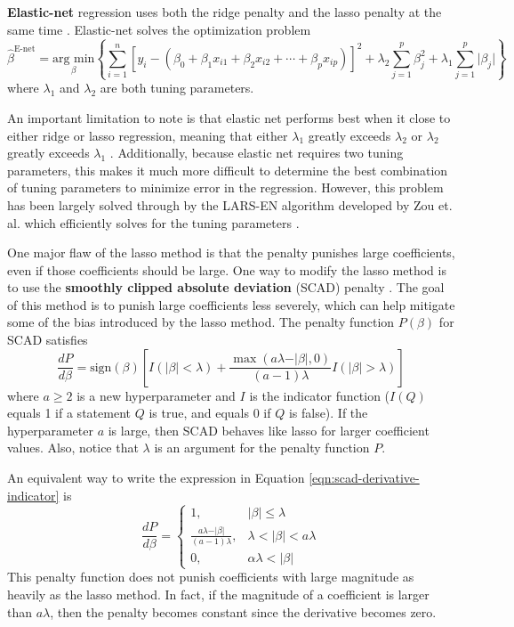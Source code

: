 \documentclass{article}
\newcommand{\argmin}[2]{\underset{#1}{\text{arg min}}\left\{#2\right\}}
\newcommand{\sign}{\text{sign}}
\begin{document}
\textbf{Elastic-net} regression uses both the ridge penalty and the lasso penalty at the same time \cite{zou2005regularization}. Elastic-net solves the optimization problem
\begin{equation}
	\hat{\beta}^{\text{E-net}}=\argmin{\beta}{\sum\limits_{i = 1}^n [y_i - (\beta_0 + \beta_1 x_{i1} + \beta_2 x_{i2} + \cdots + \beta_p x_{ip})]^2 + \lambda_2\sum\limits_{j = 1}^p \beta_j^2 + \lambda_1\sum\limits_{j = 1}^p \vert \beta_j \vert}
\end{equation}
where $\lambda_1$ and $\lambda_2$ are both tuning parameters.

An important limitation to note is that elastic net performs best when it close to either ridge or lasso regression, meaning that either $\lambda_1$ greatly exceeds $\lambda_2$ or $\lambda_2$ greatly exceeds $\lambda_1$ \cite{zou2005regularization}. Additionally, because elastic net requires two tuning parameters, this makes it much more difficult to determine the best combination of tuning parameters to minimize error in the regression. However, this problem has been largely solved through by the LARS-EN algorithm developed by Zou et. al. which efficiently solves for the tuning parameters \cite{zou2005regularization}.

One major flaw of the lasso method is that the penalty punishes large coefficients, even if those coefficients should be large. One way to modify the lasso method is to use the \textbf{smoothly clipped absolute deviation} (SCAD) penalty \cite{fan2001variable}. The goal of this method is to punish large coefficients less severely, which can help mitigate some of the bias introduced by the lasso method. The penalty function $P(\beta)$ for SCAD satisfies
\begin{equation}\label{eqn:scad-derivative-indicator}
	\frac{dP}{d\beta} = \sign(\beta)\left[ I(\vert \beta \vert<\lambda) + \frac{\max(a\lambda - \vert \beta\vert, 0)}{(a - 1)\lambda}I(\vert \beta \vert > \lambda) \right]
\end{equation}
where $a\geq 2$ is a new hyperparameter and $I$ is the indicator function ($I(Q)$ equals 1 if a statement $Q$ is true, and equals 0 if $Q$ is false). If the hyperparameter $a$ is large, then SCAD behaves like lasso for larger coefficient values. Also, notice that $\lambda$ is an argument for the penalty function $P$.

An equivalent way to write the expression in Equation \ref{eqn:scad-derivative-indicator} is
\begin{equation}
	\frac{dP}{d\beta} = \left\{\begin{array}{ll}
		1,&\vert \beta \vert\leq \lambda\\
		\frac{a\lambda - \vert \beta \vert}{(a - 1)\lambda},&\lambda < \vert \beta \vert < a\lambda\\
		0,&\alpha\lambda < \vert \beta \vert
	\end{array}\right.
\end{equation}
This penalty function does not punish coefficients with large magnitude as heavily as the lasso method. In fact, if the magnitude of a coefficient is larger than $a\lambda$, then the penalty becomes constant since the derivative becomes zero.
\end{document}
